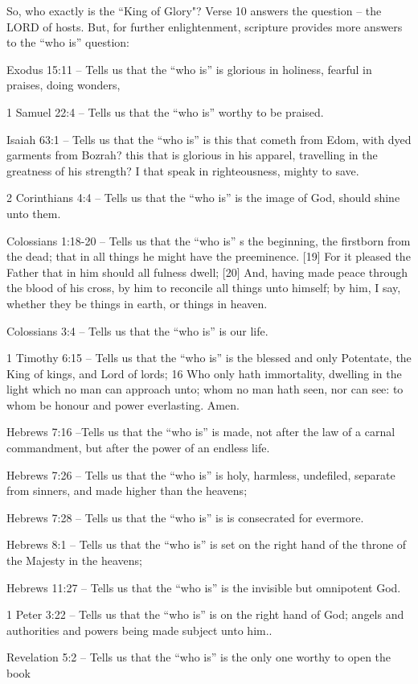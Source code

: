 So, who exactly is the ``King of Glory"? Verse 10 answers the question -- the LORD of hosts.  But, for further enlightenment, scripture provides more answers to the ``who is'' question:
\begin{compactenum}
	\item Exodus 15:11 -- Tells us that the ``who is'' is glorious in holiness, fearful in praises, doing wonders,
	\item 1 Samuel 22:4 -- Tells us that the ``who is'' worthy to be praised.
	\item Isaiah 63:1 -- Tells us that the ``who is''  is this that cometh from Edom, with dyed garments from Bozrah? this that is glorious in his apparel, travelling in the greatness of his strength? I that speak in righteousness, mighty to save.
	\item 2 Corinthians 4:4 -- Tells us that the ``who is'' is the image of God, should shine unto them.
	\item Colossians 1:18-20 -- Tells us that the ``who is'' s the beginning, the firstborn from the dead; that in all things he might have the preeminence. [19] For it pleased the Father that in him should all fulness dwell; [20] And, having made peace through the blood of his cross, by him to reconcile all things unto himself; by him, I say, whether they be things in earth, or things in heaven.
	\item Colossians 3:4 -- Tells us that the ``who is'' is our life.
	\item 1 Timothy 6:15 -- Tells us that the ``who is'' is the blessed and only Potentate, the King of kings, and Lord of lords; 16 Who only hath immortality, dwelling in the light which no man can approach unto; whom no man hath seen, nor can see: to whom be honour and power everlasting. Amen. 
	\item Hebrews 7:16 --Tells us that the ``who is'' is made, not after the law of a carnal commandment, but after the power of an endless life.
	\item Hebrews 7:26 -- Tells us that the ``who is'' is holy, harmless, undefiled, separate from sinners, and made higher than the heavens;
	\item Hebrews 7:28 -- Tells us that the ``who is''  is is consecrated for evermore.
	\item Hebrews 8:1 -- Tells us that the ``who is''  is set on the right hand of the throne of the Majesty in the heavens;
	\item Hebrews 11:27 -- Tells us that the ``who is'' is the invisible but omnipotent God.
	\item 1 Peter 3:22 -- Tells us that the ``who is'' is on the right hand of God; angels and authorities and powers being made subject unto him..
	\item Revelation 5:2 -- Tells us that the ``who is'' is the only one worthy to open the book
\end{compactenum}

